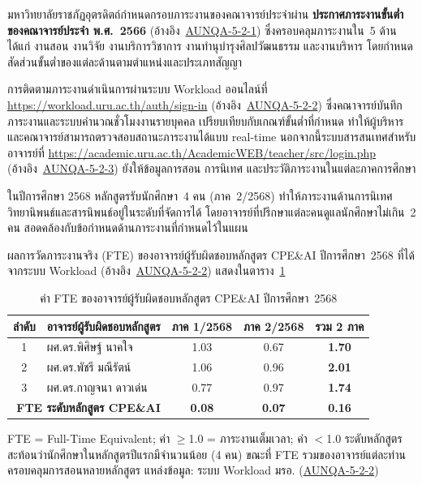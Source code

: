 
มหาวิทยาลัยราชภัฏอุตรดิตถ์กำหนดกรอบภาระงานของคณาจารย์ประจำผ่าน \textbf{ประกาศภาระงานขั้นต่ำของคณาจารย์ประจำ พ.ศ.~2566} (อ้างอิง~\hyperlink{ref:AUNQA-5-2-1}{AUNQA-5-2-1}) ซึ่งครอบคลุมภาระงานใน~5 ด้าน ได้แก่ งานสอน งานวิจัย งานบริการวิชาการ งานทำนุบำรุงศิลปวัฒนธรรม และงานบริหาร โดยกำหนดสัดส่วนขั้นต่ำของแต่ละด้านตามตำแหน่งและประเภทสัญญา

การติดตามภาระงานดำเนินการผ่านระบบ Workload ออนไลน์ที่ \url{https://workload.uru.ac.th/auth/sign-in} (อ้างอิง~\hyperlink{ref:AUNQA-5-2-2}{AUNQA-5-2-2}) ซึ่งคณาจารย์บันทึกภาระงานและระบบคำนวณชั่วโมงงานรายบุคคล เปรียบเทียบกับเกณฑ์ขั้นต่ำที่กำหนด ทำให้ผู้บริหารและคณาจารย์สามารถตรวจสอบสถานะภาระงานได้แบบ real-time นอกจากนี้ระบบสารสนเทศสำหรับอาจารย์ที่ \url{https://academic.uru.ac.th/AcademicWEB/teacher/src/login.php} (อ้างอิง~\hyperlink{ref:AUNQA-5-2-3}{AUNQA-5-2-3}) ยังให้ข้อมูลการสอน การนิเทศ และประวัติภาระงานในแต่ละภาคการศึกษา

ในปีการศึกษา 2568 หลักสูตรรับนักศึกษา~4 คน (ภาค~2/2568) ทำให้ภาระงานด้านการนิเทศวิทยานิพนธ์และสารนิพนธ์อยู่ในระดับที่จัดการได้ โดยอาจารย์ที่ปรึกษาแต่ละคนดูแลนักศึกษาไม่เกิน~2 คน สอดคล้องกับข้อกำหนดด้านภาระงานที่กำหนดไว้ในแผน

ผลการวัดภาระงานจริง (FTE) ของอาจารย์ผู้รับผิดชอบหลักสูตร CPE\&AI ปีการศึกษา~2568 ที่ได้จากระบบ Workload (อ้างอิง~\hyperlink{ref:AUNQA-5-2-2}{AUNQA-5-2-2}) แสดงในตาราง~\ref{tbl:fte_rp_2568}

\begin{table}[H]
  \centering
  \caption{ค่า FTE ของอาจารย์ผู้รับผิดชอบหลักสูตร CPE\&AI ปีการศึกษา~2568}
  \label{tbl:fte_rp_2568}
  \begingroup
  \footnotesize
  \setlength{\tabcolsep}{6pt}
  \renewcommand{\arraystretch}{1.2}
  \begin{tabularx}{\linewidth}{|c|>{\raggedright\arraybackslash}X|c|c|c|}
    \hline
    \textbf{ลำดับ} & \textbf{อาจารย์ผู้รับผิดชอบหลักสูตร} & \textbf{ภาค 1/2568} & \textbf{ภาค 2/2568} & \textbf{รวม 2 ภาค} \\
    \hline
    1 & ผศ.ดร.พิศิษฐ์ นาคใจ & 1.03 & 0.67 & \textbf{1.70} \\
    \hline
    2 & ผศ.ดร.พัชรี มณีรัตน์ & 1.06 & 0.96 & \textbf{2.01} \\
    \hline
    3 & ผศ.ดร.กาญจนา ดาวเด่น & 0.77 & 0.97 & \textbf{1.74} \\
    \hline
    \multicolumn{2}{|r|}{\textbf{FTE ระดับหลักสูตร CPE\&AI}} & \textbf{0.08} & \textbf{0.07} & \textbf{0.16} \\
    \hline
  \end{tabularx}
  \endgroup
  \begin{flushleft}
    \footnotesize FTE = Full-Time Equivalent; ค่า $\geq$1.0 = ภาระงานเต็มเวลา; ค่า $<$1.0 ระดับหลักสูตรสะท้อนว่านักศึกษาในหลักสูตรปีแรกมีจำนวนน้อย (4 คน) ขณะที่ FTE รวมของอาจารย์แต่ละท่านครอบคลุมการสอนหลายหลักสูตร แหล่งข้อมูล: ระบบ Workload มรอ. (\hyperlink{ref:AUNQA-5-2-2}{AUNQA-5-2-2})
  \end{flushleft}
\end{table}

